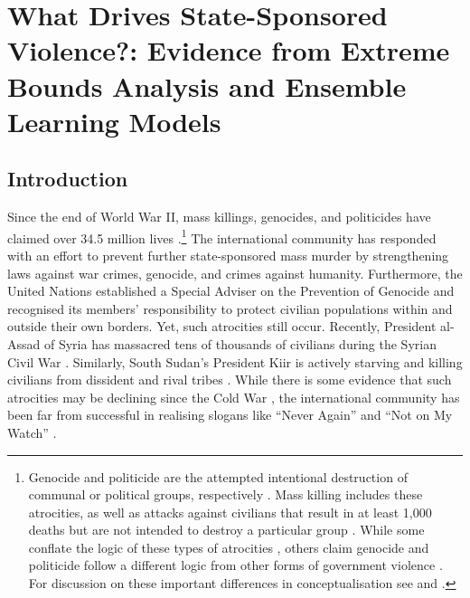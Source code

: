 \chapter{What Drives State-Sponsored Violence?: Evidence from Extreme Bounds Analysis and Ensemble Learning Models}
\label{chap:killings}

\section{Introduction}
\label{sec:intro4}

Since the end of World War II, mass killings, genocides, and politicides have claimed over 34.5 million lives \citep{marshall2017pitf}.\footnote{Genocide and politicide are the attempted intentional destruction of communal or political groups, respectively \citep[see][]{harff1988toward}. Mass killing includes these atrocities, as well as attacks against civilians that result in at least 1,000 deaths but are not intended to destroy a particular group \citep[see][]{ulfelder2008assessing}. While some conflate the logic of these types of atrocities \citep[e.g.,][]{rummel1995democracy, valentino2004draining}, others claim genocide and politicide follow a different logic from other forms of government violence \citep{kalyvas2006logic,stanton2015regulating}. For discussion on these important differences in conceptualisation see \citet[]{straus2007second} and \citet{finkel2012macro}.} The international community has responded with an effort to prevent further state-sponsored mass murder by strengthening laws against war crimes, genocide, and crimes against humanity. Furthermore, the United Nations established a Special Adviser on the Prevention of Genocide and recognised its members' responsibility to protect civilian populations within and outside their own borders. Yet, such atrocities still occur. Recently, President al-Assad of Syria has massacred tens of thousands of civilians during the Syrian Civil War \citep{goldman2017nyt}. Similarly, South Sudan's President Kiir is actively starving and killing civilians from dissident and rival tribes \citep{nichols2017reuters}. While there is some evidence that such atrocities may be declining since the Cold War \citep{valentino2014we}, the international community has been far from successful in realising slogans like ``Never Again'' and ``Not on My Watch'' \citep{cheadle2007not}.
	
